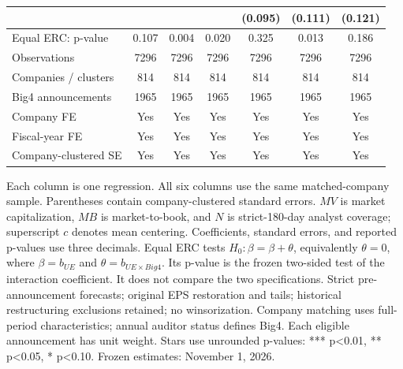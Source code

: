 \documentclass[10pt]{article}
\begin{document}
\begin{tabular*}{\textwidth}{@{\extracolsep{\fill}}lcccccc@{}}
 &  &  &  & (0.095) & (0.111) & (0.121) \\
\midrule
Equal ERC: p-value & 0.107 & 0.004 & 0.020 & 0.325 & 0.013 & 0.186 \\
Observations & 7296 & 7296 & 7296 & 7296 & 7296 & 7296 \\
Companies / clusters & 814 & 814 & 814 & 814 & 814 & 814 \\
Big4 announcements & 1965 & 1965 & 1965 & 1965 & 1965 & 1965 \\
Company FE & Yes & Yes & Yes & Yes & Yes & Yes \\
Fiscal-year FE & Yes & Yes & Yes & Yes & Yes & Yes \\
Company-clustered SE & Yes & Yes & Yes & Yes & Yes & Yes \\
\bottomrule\end{tabular*}\par\medskip
\noindent\footnotesize Each column is one regression. All six columns use the same matched-company sample. Parentheses contain company-clustered standard errors. \(MV\) is market capitalization, \(MB\) is market-to-book, and \(N\) is strict-180-day analyst coverage; superscript \(c\) denotes mean centering. Coefficients, standard errors, and reported p-values use three decimals. Equal ERC tests \(H_0:\beta=\beta+\theta\), equivalently \(\theta=0\), where \(\beta=b_{UE}\) and \(\theta=b_{UE\times Big4}\). Its p-value is the frozen two-sided test of the interaction coefficient. It does not compare the two specifications. Strict pre-announcement forecasts; original EPS restoration and tails; historical restructuring exclusions retained; no winsorization. Company matching uses full-period characteristics; annual auditor status defines Big4. Each eligible announcement has unit weight. Stars use unrounded p-values: *** p<0.01, ** p<0.05, * p<0.10. Frozen estimates: November 1, 2026.
\end{document}
